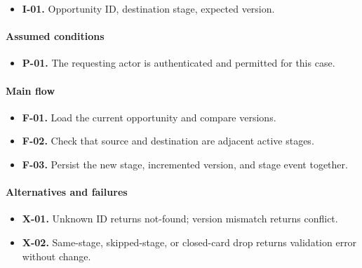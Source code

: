 \documentclass[10pt,a4paper]{article}
\begin{document}
\begin{itemize}

\item \textbf{I-01.} Opportunity ID, destination stage, expected version.

\end{itemize}

\paragraph{Assumed conditions}

\begin{itemize}

\item \textbf{P-01.} The requesting actor is authenticated and permitted for this case.

\end{itemize}

\paragraph{Main flow}

\begin{itemize}

\item \textbf{F-01.} Load the current opportunity and compare versions.

\item \textbf{F-02.} Check that source and destination are adjacent active stages.

\item \textbf{F-03.} Persist the new stage, incremented version, and stage event together.

\end{itemize}

\paragraph{Alternatives and failures}

\begin{itemize}

\item \textbf{X-01.} Unknown ID returns not-found; version mismatch returns conflict.

\item \textbf{X-02.} Same-stage, skipped-stage, or closed-card drop returns validation error without change.

\end{itemize}
\end{document}

